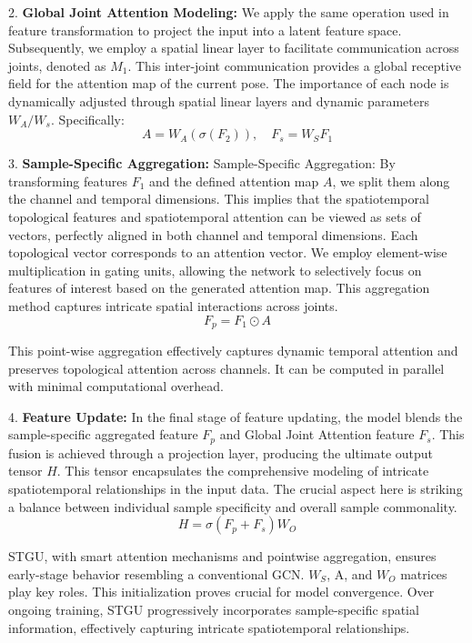 \documentclass[conference,a4paper,english]{IEEEtran}[2015/08/26]
\begin{document}
2. \textbf{Global Joint Attention Modeling:} We apply the same operation used in feature transformation 
to project the input into a latent feature space. Subsequently, we employ a spatial linear layer to 
facilitate communication across joints, denoted as \(M_1\). 
This inter-joint communication provides a global receptive field for the attention map of the current pose.
 The importance of each node is dynamically adjusted through spatial linear layers and dynamic 
 parameters \(W_A/W_s\). Specifically:
   \[
    A = W_A(\sigma(F_2)), \quad F_s = W_SF_1\tag{21}
   \]

3. \textbf{Sample-Specific Aggregation:} Sample-Specific Aggregation:
 By transforming features \(F_1\) and the defined attention map \(A\), 
 we split them along the channel and temporal dimensions. This implies that the spatiotemporal 
 topological features and spatiotemporal attention can be viewed as sets of vectors, perfectly 
 aligned in both channel and temporal dimensions. Each topological vector corresponds to an attention 
 vector. We employ element-wise multiplication in gating units, allowing the network to selectively focus 
 on features of interest based on the generated attention map. 
This aggregation method captures intricate spatial interactions across joints.
   \[
   F_p = F_1 \odot A\tag{22}
   \]

   This point-wise aggregation effectively captures dynamic temporal attention and preserves topological 
   attention across channels. 
   It can be computed in parallel with minimal computational overhead.



4. \textbf{Feature Update:} In the final stage of feature updating, the model blends the sample-specific 
aggregated feature \(F_p\) and Global Joint Attention feature \(F_s\). This fusion is achieved through 
a projection layer, producing the ultimate output tensor \(H\). This tensor encapsulates the comprehensive 
modeling of intricate spatiotemporal relationships in the input data. The crucial 
aspect here is striking a balance between individual sample specificity and overall sample commonality.
   \[
   H = \sigma(F_p + F_s)W_O\tag{23}
   \]

   STGU, with smart attention mechanisms and pointwise aggregation, 
   ensures early-stage behavior resembling a conventional GCN. \(W_S\), A, and \(W_O\) matrices play 
   key roles. This initialization proves crucial for model convergence. Over ongoing training, 
   STGU progressively incorporates sample-specific 
   spatial information, effectively capturing intricate spatiotemporal relationships.
\end{document}
